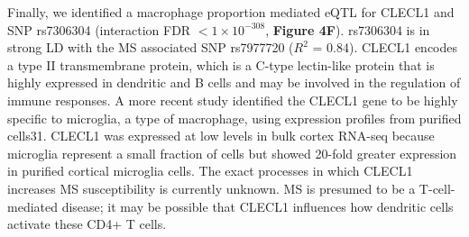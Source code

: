 {{Finally, we identified a macrophage proportion mediated eQTL for CLECL1 and SNP rs7306304 (interaction  FDR $< 1 \times 10^{-308}$, \textbf{Figure 4F}). rs7306304 is in strong LD with the MS associated SNP rs7977720 ($R^2$ = 0.84)\cite{consortium*+MultipleSclerosisGenomic2019}. CLECL1 encodes a type II transmembrane protein, which is a C-type lectin-like protein that is highly expressed in dendritic and B cells and may be involved in the regulation of immune responses\cite{vanluijnMultipleSclerosisassociatedCLEC16A2015}. A more recent study identified the CLECL1 gene to be highly specific to microglia, a type of macrophage, using expression profiles from purified cells31. CLECL1 was expressed at low levels in bulk cortex RNA-seq because microglia represent a small fraction of cells but showed 20-fold greater expression in purified cortical microglia cells\cite{consortium*+MultipleSclerosisGenomic2019}. The exact processes in which CLECL1 increases MS susceptibility is currently unknown. MS is presumed to be a T-cell- mediated disease; it may be possible that CLECL1 influences how dendritic cells activate these CD4+ T cells. 

}}
